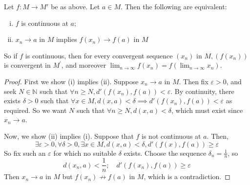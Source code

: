 \documentclass[a4paper]{article}
\begin{document}
\begin{proposition}
	Let \( f \colon M \to M' \) be as above.
	Let \( a \in M \).
	Then the following are equivalent:
	\begin{enumerate}[(i)]
		\item \( f \) is continuous at \( a \);
		\item \( x_n \to a \) in \( M \) implies \( f(x_n) \to f(a) \) in \( M \)
	\end{enumerate}
    So if $f$ is continuous, then for every convergent sequence $\left(x_n\right)$ in $M,\left(f\left(x_n\right)\right)$ is convergent in $M^{\prime}$, and moreover $\lim _{n \rightarrow \infty} f\left(x_n\right)=f\left(\lim _{n \rightarrow \infty} x_n\right)$.
\end{proposition}
\begin{proof}
	First we show (i) implies (ii).
	Suppose \( x_n \to a \) in \( M \).
	Then fix \( \varepsilon > 0 \), and seek \( N \in \mathbb N \) such that \( \forall n \geq N, d'(f(x_n), f(a)) < \varepsilon \).
	By continuity, there exists \( \delta > 0 \) such that \( \forall x \in M, d(x,a) < \delta \implies d'(f(x_n), f(a)) < \varepsilon \) as required.
	So we want \( N \) such that \( \forall n \geq N, d(x,a) < \delta \), which must exist since \( x_n \to a \).

	Now, we show (ii) implies (i).
	Suppose that \( f \) is not continuous at \( a \).
	Then,
	\[
		\exists \varepsilon > 0, \forall \delta > 0, \exists x \in M, d(x,a) < \delta, d'(f(x), f(a)) \geq \varepsilon
	\]
	So fix such an \( \varepsilon \) for which no suitable \( \delta \) exists.
	Choose the sequence \( \delta_n = \frac{1}{n} \), so
	\[
		d(x_n,a) < \frac{1}{n};\quad d'(f(x_n), f(a)) \geq \varepsilon
	\]
	Then \( x_n \to a \) in \( M \) but \( f(x_n) \not\to f(a) \) in \( M \), which is a contradiction.
\end{proof}
\end{document}
